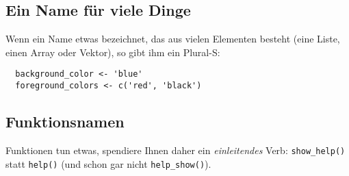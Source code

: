 \documentclass[twoside]{scrreprt}
\providecommand{\code}[1]{\texttt{#1}}
\begin{document}
\subsection{Ein Name f\"u{}r viele Dinge}
Wenn ein Name etwas bezeichnet, das aus vielen Elementen besteht (eine Liste,
einen Array oder Vektor), so gibt ihm ein Plural-S:
\begin{lstlisting}
  background_color <- 'blue'
  foreground_colors <- c('red', 'black')
\end{lstlisting}

\subsection{Funktionsnamen}
Funktionen tun etwas, spendiere Ihnen daher ein \emph{einleitendes} Verb:
\code{show\_help()} statt \code{help()} (und schon gar nicht  
\code{help\_show()}).
\end{document}
